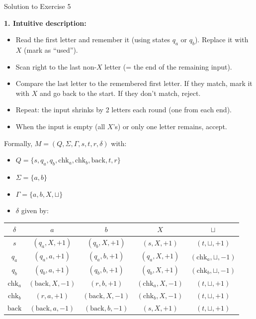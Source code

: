 \documentclass[11pt,a4paper]{article}
\newcommand{\blank}{\sqcup}
\begin{document}
\begin{solutionbox}{Solution to Exercise 5}

\textbf{1. Intuitive description:}

\begin{itemize}
    \item Read the first letter and remember it (using states $q_a$ or $q_b$). Replace it with $X$ (mark as ``used'').
    \item Scan right to the last non-$X$ letter (= the end of the remaining input).
    \item Compare the last letter to the remembered first letter. If they match, mark it with $X$ and go back to the start. If they don't match, reject.
    \item Repeat: the input shrinks by 2 letters each round (one from each end).
    \item When the input is empty (all $X$'s) or only one letter remains, accept.
\end{itemize}

Formally, $M = (Q, \Sigma, \Gamma, s, t, r, \delta)$ with:
\begin{itemize}
    \item $Q = \{s, q_a, q_b, \text{chk}_a, \text{chk}_b, \text{back}, t, r\}$
    \item $\Sigma = \{a, b\}$
    \item $\Gamma = \{a, b, X, \blank\}$
    \item $\delta$ given by:
\end{itemize}

\begin{center}
\begin{tabular}{c|c|c|c|c}
$\delta$ & $a$ & $b$ & $X$ & $\blank$ \\
\hline
$s$         & $(q_a, X, +1)$     & $(q_b, X, +1)$     & $(s, X, +1)$         & $(t, \blank, +1)$ \\
$q_a$       & $(q_a, a, +1)$     & $(q_a, b, +1)$     & $(q_a, X, +1)$       & $(\text{chk}_a, \blank, -1)$ \\
$q_b$       & $(q_b, a, +1)$     & $(q_b, b, +1)$     & $(q_b, X, +1)$       & $(\text{chk}_b, \blank, -1)$ \\
$\text{chk}_a$ & $({\text{back}}, X, -1)$ & $(r, b, +1)$ & $(\text{chk}_a, X, -1)$ & $(t, \blank, +1)$ \\
$\text{chk}_b$ & $(r, a, +1)$       & $({\text{back}}, X, -1)$ & $(\text{chk}_b, X, -1)$ & $(t, \blank, +1)$ \\
$\text{back}$ & $(\text{back}, a, -1)$ & $(\text{back}, b, -1)$ & $(s, X, +1)$    & $(t, \blank, +1)$ \\
\end{tabular}
\end{center}


\end{solutionbox}
\end{document}
